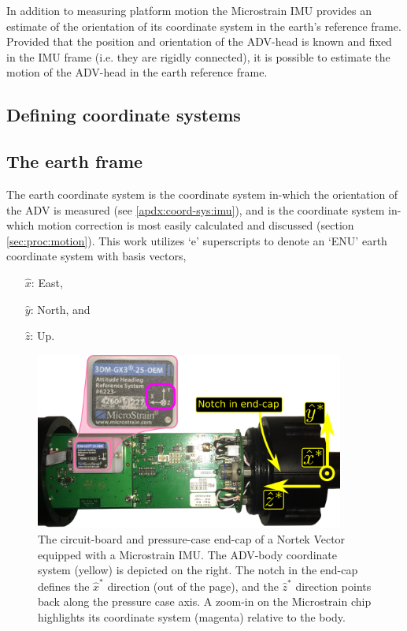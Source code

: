 \documentclass[twocol]{ametsoc}
\def\earth{}
\begin{document}
In addition to measuring platform motion the Microstrain IMU provides
an estimate of the orientation of its coordinate system in the earth's
reference frame. Provided that the position and orientation of the
ADV-head is known and fixed in the IMU frame (i.e. they are rigidly
connected), it is possible to estimate the motion of the ADV-head in
the earth reference frame.




\subsection{Defining coordinate systems}\label{apdx:coord-sys:math}


\subsection{The earth frame}
The earth coordinate system is the coordinate system in-which the orientation of the ADV is measured (see \ref{apdx:coord-sys:imu}), and is the coordinate system in-which motion correction is most easily calculated and discussed (section \ref{sec:proc:motion}).  This work utilizes `e' superscripts to denote an `ENU' earth coordinate system with basis vectors,
\begin{itemize}
\item[$\hat{x}\earth$:] East,
\item[$\hat{y}\earth$:] North, and
\item[$\hat{z}\earth$:] Up.
\end{itemize}

\begin{figure}
  \centering
  \includegraphics[width=4in]{IMUtest}
  \caption{The circuit-board and pressure-case end-cap of a Nortek Vector equipped with a Microstrain IMU.  The ADV-body coordinate system (yellow) is depicted on the right. The notch in the end-cap defines the $\hat{x}^*$ direction (out of the page), and the $\hat{z}^*$ direction points back along the pressure case axis. A zoom-in on the Microstrain chip highlights its coordinate system (magenta) relative to the body. }
  \label{fig:imu_orient}
\end{figure}
\end{document}
